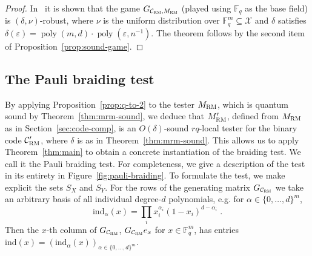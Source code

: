 \documentclass[11pt]{article}
\theoremstyle{definition}
\newcommand{\code}{\mathcal{C}}
\newcommand{\F}{\ensuremath{\mathbb{F}}}
\newcommand{\mX}{\ensuremath{\mathcal{X}}}
\newcommand{\RM}{\ensuremath{\textsc{RM}}}
\newcommand{\ind}{\ensuremath{\mathrm{ind}}}
\DeclareMathOperator{\poly}{poly}
\newcommand{\eps}{\varepsilon}
\begin{document}
\begin{proof}
In~\cite{ji2022quantum} it is shown that the game $G_{\code_\RM,M_\RM}$ (played using $\F_q$ as the base field) is $(\delta,\nu)$-robust, where $\nu$ is the uniform distribution over $\F_q^m \subseteq \mX$ and $\delta$ satisfies $\delta(\eps)=\poly(m,d)\cdot \poly(\eps,n^{-1})$. The theorem follows by the second item of Proposition~\ref{prop:sound-game}. 
\end{proof}


\subsection{The Pauli braiding test}

By applying Proposition~\ref{prop:q-to-2} to the tester $M_\RM$, which is quantum sound by Theorem~\ref{thm:mrm-sound}, we deduce that $M'_\RM$, defined from $M_\RM$ as in Section~\ref{sec:code-comp}, is an $O(\delta)$-sound $rq$-local tester for the binary code $\code'_{\RM}$, where $\delta$ is as in Theorem~\ref{thm:mrm-sound}. This allows us to apply Theorem~\ref{thm:main} to obtain a concrete instantiation of the braiding test. We call it the Pauli braiding test. For completeness, we give a description of the test in its entirety in Figure~\ref{fig:pauli-braiding}. To formulate the test, we make explicit the sets $S_X$ and $S_Y$. For the rows of the generating matrix $G_{\code_\RM}$ we take an arbitrary basis of all individual degree-$d$ polynomials, e.g. for $\alpha \in \{0,\ldots,d\}^m$, 
\[ \ind_{\alpha}(x) = \prod_{i} x_i^{\alpha_i} (1-x_i)^{d-\alpha_i}\;.\]
Then the $x$-th column of $G_{\code_\RM}$, $G_{\code_{\RM}}e_x$ for $x\in \F_q^m$, has entries $\ind(x)=(\ind_{\alpha}(x))_{\alpha\in\{0,\ldots,d\}^m}$.
\end{document}
